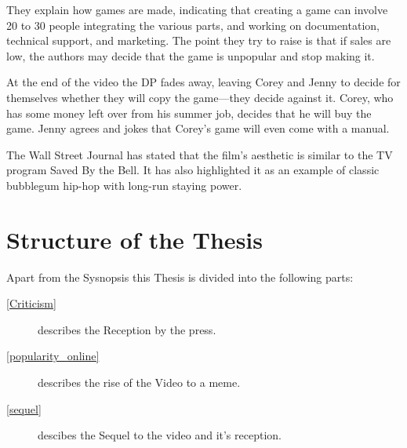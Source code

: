 They explain how games are made, indicating that creating a game can involve 20 to 30 people integrating the various parts, and working on documentation, technical support, and marketing. The point they try to raise is that if sales are low, the authors may decide that the game is unpopular and stop making it.

At the end of the video the DP fades away, leaving Corey and Jenny to decide for themselves whether they will copy the game—they decide against it. Corey, who has some money left over from his summer job, decides that he will buy the game. Jenny agrees and jokes that Corey's game will even come with a manual.

The Wall Street Journal has stated that the film's aesthetic is similar to the TV program Saved By the Bell. It has also highlighted it as an example of classic bubblegum hip-hop with long-run staying power.
\section{Structure of the Thesis}

Apart from the Sysnopsis this Thesis is divided into the following parts:
\begin{description}
  \item[\ref{Criticism}] describes the Reception by the press.
  \item[\ref{popularity_online}] describes the rise of the Video to a meme.
  \item[\ref{sequel}] descibes the Sequel to the video and it's reception.
\end{description}

